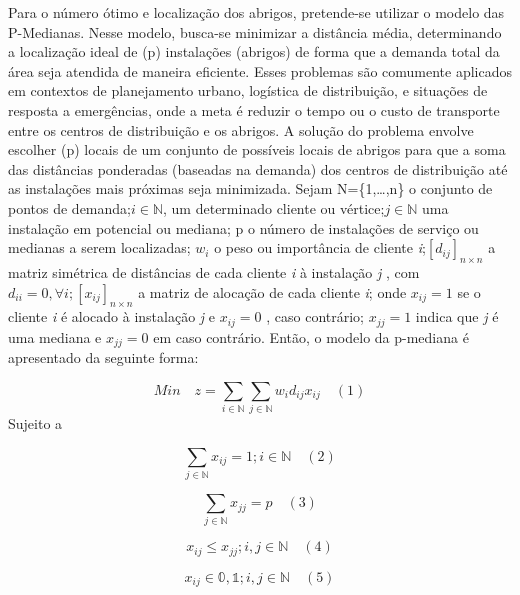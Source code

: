 \documentclass[
]{article}
\begin{document}
Para o número ótimo e localização dos abrigos, pretende-se utilizar o
modelo das P-Medianas. Nesse modelo, busca-se minimizar a distância
média, determinando a localização ideal de (p) instalações (abrigos) de
forma que a demanda total da área seja atendida de maneira eficiente.
Esses problemas são comumente aplicados em contextos de planejamento
urbano, logística de distribuição, e situações de resposta a
emergências, onde a meta é reduzir o tempo ou o custo de transporte
entre os centros de distribuição e os abrigos. A solução do problema
envolve escolher (p) locais de um conjunto de possíveis locais de
abrigos para que a soma das distâncias ponderadas (baseadas na demanda)
dos centros de distribuição até as instalações mais próximas seja
minimizada. Sejam N=\{1,\ldots,n\} o conjunto de pontos de
demanda;\(i \in \mathbb{N}\), um determinado cliente ou
vértice;\(j \in \mathbb{N}\) uma instalação em potencial ou mediana; p o
número de instalações de serviço ou medianas a serem localizadas;
\(w_i\) o peso ou importância de cliente
\emph{i};\([d_{ij}]_{n \times n}\) a matriz simétrica de distâncias de
cada cliente \emph{i} à instalação \emph{j} , com
\(d_{ii}=0, \forall i; [x_{ij}]_{n \times n}\) a matriz de alocação de
cada cliente \emph{i}; onde \(x_{ij}=1\) se o cliente \emph{i} é alocado
à instalação \emph{j} e \(x_{ij}=0\) , caso contrário; \(x_{jj}=1\)
indica que \emph{j} é uma mediana e \(x_{jj}=0\) em caso contrário.
Então, o modelo da p-mediana é apresentado da seguinte forma:

\[
Min \quad  z=\sum_{i \in \mathbb{N}} \sum_{j \in \mathbb{N}} w_{i}d_{ij}x_{ij} \quad    (1)
\] Sujeito a

\[
\sum_{j \in \mathbb{N}}x_{ij}=1; i \in \mathbb{N} \quad (2)
\]

\[
\sum_{j \in \mathbb{N}}x_{jj}=p \quad (3)
\]

\[
x_{ij} \leq x_{jj}; i,j \in \mathbb{N} \quad (4)
\]

\[x_{ij} \in \mathbb{0,1}; i,j \in \mathbb{N}\quad (5) \]
\end{document}
